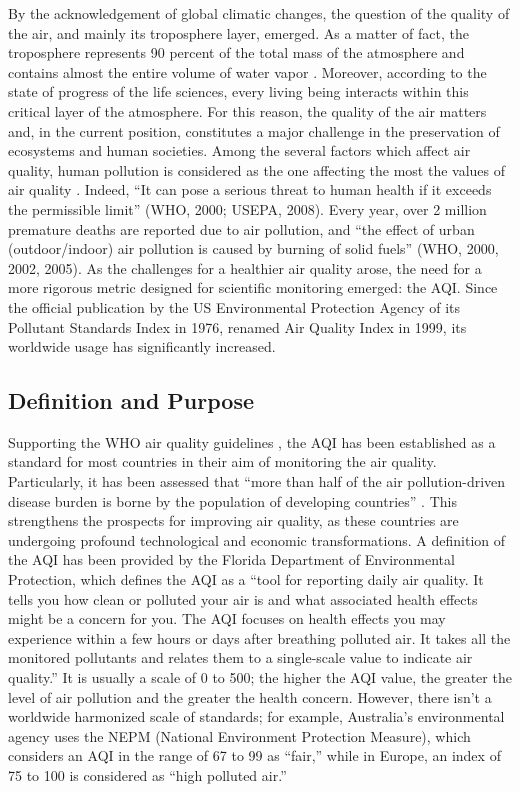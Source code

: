 \documentclass[11pt]{article}
\begin{document}
By the acknowledgement of global climatic changes, the question of the quality of the air, and mainly its troposphere layer, emerged. As a matter of fact, the troposphere represents 90 percent of the total mass of the atmosphere and contains almost the entire volume of water vapor \citep{olschewski2025}. Moreover, according to the state of progress of the life sciences, every living being interacts within this critical layer of the atmosphere. For this reason, the quality of the air matters and, in the current position, constitutes a major challenge in the preservation of ecosystems and human societies. Among the several factors which affect air quality, human pollution is considered as the one affecting the most the values of air quality \citep{beig2010}. Indeed, ``It can pose a serious threat to human health if it exceeds the permissible limit'' (WHO, 2000; USEPA, 2008). Every year, over 2 million premature deaths are reported due to air pollution, and ``the effect of urban (outdoor/indoor) air pollution is caused by burning of solid fuels'' (WHO, 2000, 2002, 2005). As the challenges for a healthier air quality arose, the need for a more rigorous metric designed for scientific monitoring emerged: the AQI. Since the official publication by the US Environmental Protection Agency of its Pollutant Standards Index in 1976, renamed Air Quality Index in 1999, its worldwide usage has significantly increased.

\subsection{Definition and Purpose}

Supporting the WHO air quality guidelines \citep{who2021}, the AQI has been established as a standard for most countries in their aim of monitoring the air quality. Particularly, it has been assessed that ``more than half of the air pollution-driven disease burden is borne by the population of developing countries'' \citep{beig2010}. This strengthens the prospects for improving air quality, as these countries are undergoing profound technological and economic transformations. A definition of the AQI has been provided by the Florida Department of Environmental Protection, which defines the AQI as a ``tool for reporting daily air quality. It tells you how clean or polluted your air is and what associated health effects might be a concern for you. The AQI focuses on health effects you may experience within a few hours or days after breathing polluted air. It takes all the monitored pollutants and relates them to a single-scale value to indicate air quality.'' It is usually a scale of 0 to 500; the higher the AQI value, the greater the level of air pollution and the greater the health concern. However, there isn't a worldwide harmonized scale of standards; for example, Australia's environmental agency uses the NEPM (National Environment Protection Measure), which considers an AQI in the range of 67 to 99 as ``fair,'' while in Europe, an index of 75 to 100 is considered as ``high polluted air.''
\end{document}
